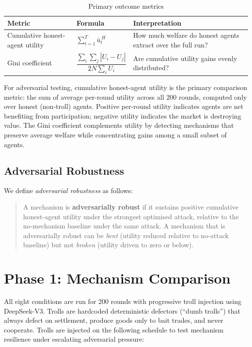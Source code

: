 \documentclass{article}
\begin{document}
\begin{table}[H]
\centering
\begin{tabular}{@{}lll@{}}
\toprule
Metric & Formula & Interpretation \\
\midrule
Cumulative honest-agent utility & $\sum_{t=1}^{T} \bar{u}^{\,H}_t$ & How much welfare do honest agents extract over the full run? \\[8pt]
Gini coefficient & $\dfrac{\sum_i\sum_j |U_i - U_j|}{2N\sum_i U_i}$ & Are cumulative utility gains evenly distributed? \\
\bottomrule
\end{tabular}
\caption{Primary outcome metrics}
\label{tab:metrics}
\end{table}

For adversarial testing, cumulative honest-agent utility is the primary comparison metric: the sum of average per-round utility across all 200 rounds, computed only over honest (non-troll) agents. Positive per-round utility indicates agents are net benefiting from participation; negative utility indicates the market is destroying value. The Gini coefficient complements utility by detecting mechanisms that preserve average welfare while concentrating gains among a small subset of agents.

\subsection{Adversarial Robustness}

We define \textit{adversarial robustness} as follows:

\begin{quote}
A mechanism is \textbf{adversarially robust} if it sustains positive cumulative honest-agent utility under the strongest optimised attack, relative to the no-mechanism baseline under the same attack. A mechanism that is adversarially robust can be \textit{bent} (utility reduced relative to no-attack baseline) but not \textit{broken} (utility driven to zero or below).
\end{quote}

\section{Phase 1: Mechanism Comparison}
\label{sec:phase1}

All eight conditions are run for 200 rounds with progressive troll injection using DeepSeek-V3. Trolls are hardcoded deterministic defectors (``dumb trolls'') that always defect on settlement, produce goods only to bait trades, and never cooperate. Trolls are injected on the following schedule to test mechanism resilience under escalating adversarial pressure:
\end{document}
